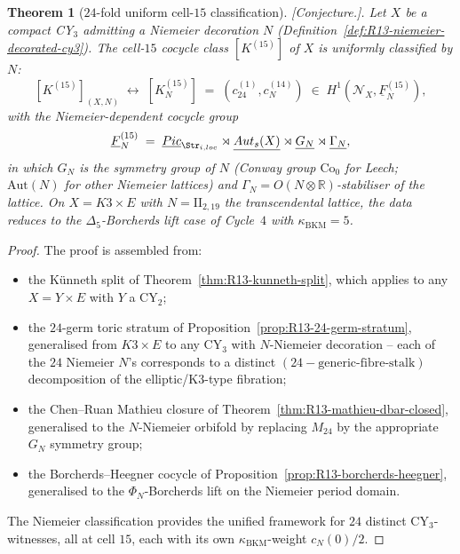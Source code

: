 \documentclass[11pt]{amsart}
\newtheorem{theorem}{Theorem}[section]
\providecommand{\kBKM}{\kappa_{\mathrm{BKM}}}
\providecommand{\R}{\mathbb{R}}
\providecommand{\Aut}{\mathrm{Aut}}
\providecommand{\Pic}{\mathrm{Pic}}
\providecommand{\cN}{\mathcal{N}}
\providecommand{\ClaimStatusConjectured}{[\emph{Conjecture.}]}
\begin{document}
\begin{theorem}[$24$-fold uniform cell-$15$ classification]
\label{thm:R13-24-fold-uniform-cell-15}
\ClaimStatusConjectured.
Let $X$ be a compact CY$_3$ admitting a Niemeier decoration $N$
(Definition~\ref{def:R13-niemeier-decorated-cy3}). The cell-$15$
cocycle class $[K^{(15)}]$ of $X$ is uniformly classified by $N$:
\[
  [K^{(15)}]_{(X, N)} \;\leftrightarrow\;
  [K^{(15)}_N] \;=\; (c^{(1)}_{24}, c^{(14)}_N) \;\in\;
  H^1(\cN_X, \underline{F}^{(15)}_N),
\]
with the Niemeier-dependent cocycle group
\[
  \underline{F}^{(15)}_N \;=\;
  \underline{\Pic}_{\Str_{i, \mathrm{loc}}} \rtimes
  \underline{\Aut_s(X)} \rtimes \underline{G_N} \rtimes
  \underline{\Gamma_N},
\]
in which $G_N$ is the symmetry group of $N$ (Conway group $\mathrm{Co}_0$
for Leech; $\mathrm{Aut}(N)$ for other Niemeier lattices) and
$\Gamma_N = O(N \otimes \R)$-stabiliser of the lattice. On
$X = K3 \times E$ with $N = \mathrm{II}_{2,19}$ the transcendental
lattice, the data reduces to the $\Delta_5$-Borcherds lift case of
Cycle~$4$ with $\kBKM = 5$.
\end{theorem}

\begin{proof}
The proof is assembled from:
\begin{itemize}
\item the K\"{u}nneth split of Theorem~\ref{thm:R13-kunneth-split},
  which applies to any $X = Y \times E$ with $Y$ a CY$_2$;
\item the $24$-germ toric stratum of Proposition~\ref{prop:R13-24-germ-stratum},
  generalised from $K3 \times E$ to any CY$_3$ with $N$-Niemeier
  decoration -- each of the $24$ Niemeier $N$'s corresponds to a distinct
  $(24-\text{generic-fibre-stalk})$ decomposition of the elliptic/K3-type
  fibration;
\item the Chen--Ruan Mathieu closure of Theorem~\ref{thm:R13-mathieu-dbar-closed},
  generalised to the $N$-Niemeier orbifold by replacing $M_{24}$ by
  the appropriate $G_N$ symmetry group;
\item the Borcherds--Heegner cocycle of
  Proposition~\ref{prop:R13-borcherds-heegner}, generalised to the
  $\Phi_N$-Borcherds lift on the Niemeier period domain.
\end{itemize}
The Niemeier classification provides the unified framework for $24$
distinct CY$_3$-witnesses, all at cell $15$, each with its own
$\kBKM$-weight $c_N(0)/2$.
\end{proof}
\end{document}
